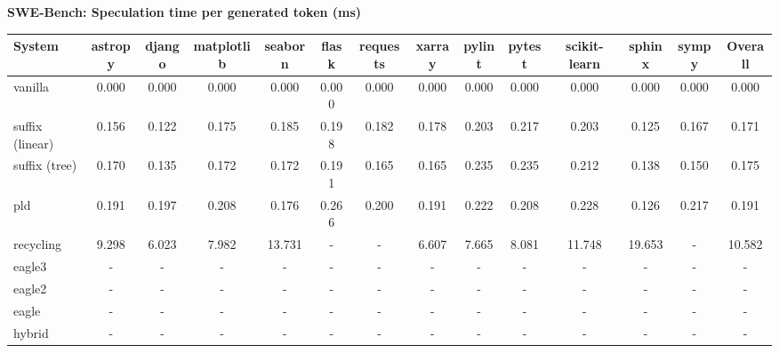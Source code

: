 \textbf{SWE-Bench: Speculation time per generated token (ms)}
\begin{table}[H]
\begin{adjustbox}{width=\linewidth}
\centering
\begin{tabular}{lccccccccccccc}
\toprule
\textbf{System} & astropy & django & matplotlib & seaborn & flask & requests & xarray & pylint & pytest & scikit-learn & sphinx & sympy & \textbf{Overall} \\
\midrule
vanilla & 0.000 & 0.000 & 0.000 & 0.000 & 0.000 & 0.000 & 0.000 & 0.000 & 0.000 & 0.000 & 0.000 & 0.000 & 0.000 \\
suffix (linear) & 0.156 & 0.122 & 0.175 & 0.185 & 0.198 & 0.182 & 0.178 & 0.203 & 0.217 & 0.203 & 0.125 & 0.167 & 0.171 \\
suffix (tree) & 0.170 & 0.135 & 0.172 & 0.172 & 0.191 & 0.165 & 0.165 & 0.235 & 0.235 & 0.212 & 0.138 & 0.150 & 0.175 \\
pld & 0.191 & 0.197 & 0.208 & 0.176 & 0.266 & 0.200 & 0.191 & 0.222 & 0.208 & 0.228 & 0.126 & 0.217 & 0.191 \\
recycling & 9.298 & 6.023 & 7.982 & 13.731 & - & - & 6.607 & 7.665 & 8.081 & 11.748 & 19.653 & - & 10.582 \\
eagle3 & - & - & - & - & - & - & - & - & - & - & - & - & - \\
eagle2 & - & - & - & - & - & - & - & - & - & - & - & - & - \\
eagle & - & - & - & - & - & - & - & - & - & - & - & - & - \\
hybrid & - & - & - & - & - & - & - & - & - & - & - & - & - \\
\bottomrule
\end{tabular}
\end{adjustbox}
\end{table}

